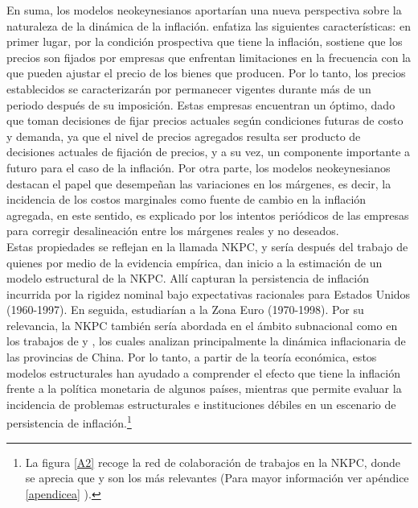 En suma, los modelos neokeynesianos aportarían una nueva perspectiva sobre la naturaleza de la dinámica de la inflación. \cite{gali2002new} enfatiza las siguientes características: en primer lugar, por la condición prospectiva que tiene la inflación, sostiene que los precios son fijados por empresas que enfrentan limitaciones en la frecuencia con la que pueden ajustar el precio de los bienes que producen. Por lo tanto, los precios establecidos se caracterizarán por permanecer vigentes durante más de un periodo después de su imposición. Estas empresas encuentran un óptimo, dado que toman decisiones de fijar precios actuales según condiciones futuras de costo y demanda, ya que el nivel de precios agregados resulta ser producto de decisiones actuales de fijación de precios, y a su vez, un componente importante a futuro para el caso de la inflación. Por otra parte, los modelos neokeynesianos destacan el papel que desempeñan las variaciones en los márgenes, es decir, la incidencia de los costos marginales como fuente de cambio en la inflación agregada, en este sentido, es explicado por los intentos periódicos de las empresas para corregir desalineación entre los márgenes reales y no deseados.  \\

Estas propiedades se reflejan en la llamada NKPC, y sería después del trabajo de \cite{gali1999inflation} quienes por medio de la evidencia empírica, dan inicio a la estimación de un modelo estructural de la NKPC. Allí capturan la persistencia de inflación incurrida por la rigidez nominal bajo expectativas racionales para Estados Unidos (1960-1997). En seguida, \cite{gali2001european}  estudiarían a la Zona Euro (1970-1998). Por su  relevancia, la NKPC también sería abordada en el ámbito subnacional como en los trabajos de \cite{ha2003causes} y \cite{mehrotra2010modelling}, los cuales analizan principalmente la dinámica inflacionaria de las provincias de China. Por lo tanto, a partir de la teoría económica, estos modelos estructurales han ayudado a comprender el efecto que tiene la inflación frente a la política monetaria de algunos países, mientras que permite evaluar la incidencia de problemas estructurales e instituciones débiles en un escenario de persistencia de inflación.\footnote{La figura \ref{A2} recoge la red de colaboración de trabajos en la NKPC, donde se aprecia que \cite{gali1999inflation} y \cite{calvo1983staggered} son los más relevantes (Para mayor información ver apéndice \ref{apendicea} ).} 

